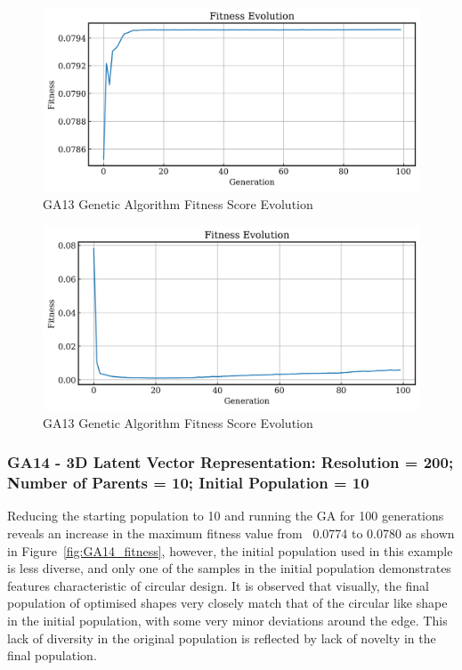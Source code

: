 \documentclass{article}
\begin{document}
\begin{figure}[H]
    \centering
    \includegraphics[width=0.75\linewidth]{figures/GAResults/GA13/latent/100gen_fitness.png}
    \caption{GA13 Genetic Algorithm Fitness Score Evolution}
    \label{fig:GA13_latent_fitness}
\end{figure}
\begin{figure}[H]
    \centering
    \includegraphics[width=0.75\linewidth]{figures/GAResults/GA13/original/original_fitness_plot.png}
    \caption{GA13 Genetic Algorithm Fitness Score Evolution}
    \label{fig:GA13_original_fitness}
\end{figure}

\subsubsection*{GA14 - 3D Latent Vector Representation: Resolution = 200; Number of Parents = 10; Initial Population = 10}
Reducing the starting population to 10 and running the GA for 100 generations reveals an increase in the maximum fitness value from ~0.0774 to 0.0780 as shown in Figure~\ref{fig:GA14_fitness}, however, the initial population used in this example is less diverse, and only one of the samples in the initial population demonstrates features characteristic of circular design. It is observed that visually, the final population of optimised shapes very closely match that of the circular like shape in the initial population, with some very minor deviations around the edge. This lack of diversity in the original population is reflected by lack of novelty in the final population. 
\end{document}
